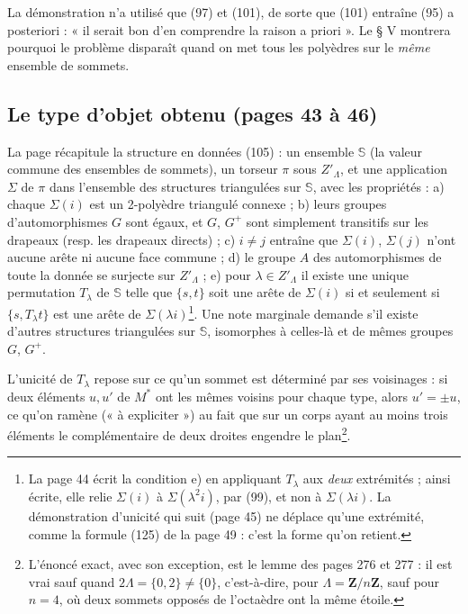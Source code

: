 \documentclass[11pt,a4paper]{article}
\begin{document}
La démonstration n'a utilisé que (97) et (101), de sorte que (101) entraîne
(95) a posteriori : « il serait bon d'en comprendre la raison a priori ». Le
§ V montrera pourquoi le problème disparaît quand on met tous les polyèdres sur
le \emph{même} ensemble de sommets.

\subsection*{Le type d'objet obtenu (pages 43 à 46)}

La page récapitule la structure en données (105) : un ensemble $\mathbb{S}$
(la valeur commune des ensembles de sommets), un torseur $\pi$ sous
$Z'_\Lambda$, et une application $\Sigma$ de $\pi$ dans l'ensemble des
structures triangulées sur $\mathbb{S}$, avec les propriétés : a) chaque
$\Sigma(i)$ est un 2-polyèdre triangulé connexe ; b) leurs groupes
d'automorphismes $G$ sont égaux, et $G$, $G^{+}$ sont simplement transitifs
sur les drapeaux (resp. les drapeaux directs) ; c) $i \neq j$ entraîne que
$\Sigma(i)$, $\Sigma(j)$ n'ont aucune arête ni aucune face commune ; d) le
groupe $A$ des automorphismes de toute la donnée se surjecte sur $Z'_\Lambda$ ;
e) pour $\lambda \in Z'_\Lambda$ il existe une unique permutation $T_\lambda$
de $\mathbb{S}$ telle que $\{s, t\}$ soit une arête de $\Sigma(i)$ si et
seulement si $\{s, T_\lambda t\}$ est une arête de $\Sigma(\lambda
i)$\footnote{La page 44 écrit la condition e) en appliquant $T_\lambda$ aux
\emph{deux} extrémités ; ainsi écrite, elle relie $\Sigma(i)$ à
$\Sigma(\lambda^2 i)$, par (99), et non à $\Sigma(\lambda i)$. La démonstration
d'unicité qui suit (page 45) ne déplace qu'une extrémité, comme la formule
(125) de la page 49 : c'est la forme qu'on retient.}. Une note marginale
demande s'il existe d'autres structures triangulées sur $\mathbb{S}$, isomorphes
à celles-là et de mêmes groupes $G$, $G^{+}$.

L'unicité de $T_\lambda$ repose sur ce qu'un sommet est déterminé par ses
voisinages : si deux éléments $u, u'$ de $M^{*}$ ont les mêmes voisins pour
chaque type, alors $u' = \pm u$, ce qu'on ramène (« à expliciter ») au fait que
sur un corps ayant au moins trois éléments le complémentaire de deux droites
engendre le plan\footnote{L'énoncé exact, avec son exception, est le lemme des
pages 276 et 277 : il est vrai sauf quand $2\Lambda = \{0, 2\} \neq \{0\}$,
c'est-à-dire, pour $\Lambda = \mathbf{Z}/n\mathbf{Z}$, sauf pour $n = 4$, où
deux sommets opposés de l'octaèdre ont la même étoile.}.
\end{document}
